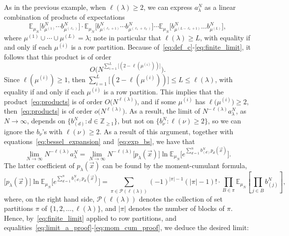 \documentclass[11pt]{article}
\theoremstyle{plain}
\newcommand{\Z}{\mathbb Z}
\newcommand{\E}{\mathbb E}
\newcommand{\la}{\lambda}
\newcommand{\vecx}{\vec{x}}
\begin{document}
As in the previous example, when $\ell(\la)\ge 2$, we can express $a_\la^N$ as a linear combination of products of expectations
\begin{equation}\label{eq:products}
\E_{\mu_N}\Big[ b_{\mu^{(1)}}^N\cdots b_{\mu^{(\ell_1)}}^N \Big]\cdot \E_{\mu_N}\Big[ b_{\mu^{(\ell_1+1)}}^N\cdots b_{\mu^{(\ell_1+\ell_2)}}^N \Big]\cdots
\E_{\mu_N}\Big[ b_{\mu^{(L-\ell_s+1)}}^N\dots b_{\mu^{(L)}}^N \Big],
\end{equation}
where $\mu^{(1)}\cup\cdots\cup\mu^{(L)}=\la$; note in particular that $\ell(\la)\ge L$, with equality if and only if each $\mu^{(i)}$ is a row partition.
Because of~\eqref{eq:def_c}-\eqref{eq:finite_limit}, it follows that this product is of order
\[
O\Big( N^{\sum_{i=1}^L\big[(2-\ell(\mu^{(i)}))\big]} \Big).
\]
Since $\ell(\mu^{(i)})\ge 1$, then $\sum_{i=1}^L\big[(2-\ell(\mu^{(i)}))\big]\le L\le\ell(\la)$, with equality if and only if each $\mu^{(i)}$ is a row partition.
This implies that the product~\eqref{eq:products} is of order $O\big(N^{\ell(\la)}\big)$, and if some $\mu^{(i)}$ has $\ell\big(\mu^{(i)}\big)\ge 2$, then~\eqref{eq:products} is of order $o\big(N^{\ell(\la)}\big)$.
As a result, the limit of $N^{-\ell(\la)}a_\la^N$, as $N\to\infty$, depends on $\big\{b_{(d)}^N\colon d\in\Z_{\ge 1}\big\}$, but not on $\big\{b_\nu^N\colon \ell(\nu)\ge 2\big\}$, so we can ignore the $b_\nu$'s with $\ell(\nu)\ge 2$.
As a result of this argument, together with equations~\eqref{eq:bessel_expansion} and~\eqref{eq:exp_bs}, we have that
\begin{equation}\label{eq:limit_a_proof}
\lim_{N\to\infty}{N^{-\ell(\la)} a_\la^N} = \lim_{N\to\infty}{N^{-\ell(\la)}}\big[p_\la(\vecx)\big]\ln\mathbb{E}_{\mu_N}\bigg[ e^{\sum_{d=1}^n{b_{(d)}^Np_d(\vecx)}} \bigg].
\end{equation}
The latter coefficient of $p_\la(\vecx)$ can be found by the moment-cumulant formula,
\begin{equation}\label{eq:mom_cum_proof}
\big[p_\la(\vecx)\big]\ln\mathbb{E}_{\mu_N}\bigg[ e^{\sum_{d=1}^n{b_{(d)}^Np_d(\vecx)}} \bigg] = \sum_{\pi\in\mathcal{P}(\ell(\la))}{ (-1)^{|\pi|-1}(|\pi|-1)!\cdot\prod_{B\in\pi}{\mathbb{E}_{\mu_N}\left[ \prod_{j\in B}{b^N_{(j)}} \right]} },
\end{equation}
where, on the right hand side, $\mathcal{P}(\ell(\la))$ denotes the collection of set partitions $\pi$ of $\{1,2,\dots,\ell(\la)\}$, and $|\pi|$ denotes the number of blocks of $\pi$.
Hence, by~\eqref{eq:finite_limit} applied to row partitions, and equalities~\eqref{eq:limit_a_proof}-\eqref{eq:mom_cum_proof}, we deduce the desired limit:
\end{document}
